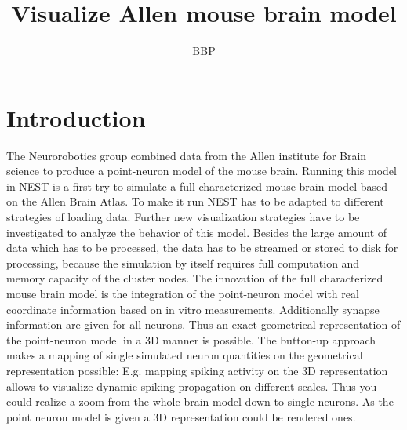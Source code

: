 \documentclass[a4paper]{article}
\title{Visualize Allen mouse brain model}
\author{BBP}
\begin{document}
   \maketitle

\section{Introduction}
The Neurorobotics group combined data from the Allen institute for Brain science to produce a point-neuron model of the mouse brain.
Running this model in NEST is a first try to simulate a full characterized mouse brain model based on the Allen Brain Atlas.
To make it run NEST has to be adapted to different strategies of loading data.
Further new visualization strategies have to be investigated to analyze the behavior of this model.
Besides the large amount of data which has to be processed, the data has to be streamed or stored to disk for processing,
because the simulation by itself requires full computation and memory capacity of the cluster nodes.
\newline
The 	innovation of the full characterized mouse brain model is the integration of the point-neuron model with real coordinate information based on in vitro measurements. Additionally synapse information are given for all neurons.
Thus an exact geometrical representation of the point-neuron model in a 3D manner is possible.
The button-up approach makes a mapping of single simulated neuron quantities on the geometrical representation possible: 
E.g. mapping spiking activity on the 3D representation allows to visualize dynamic spiking propagation on different scales.
Thus you could realize a zoom from the whole brain model down to single neurons.
As the point neuron model is given a 3D representation could be rendered ones.




%

%
\end{document}
